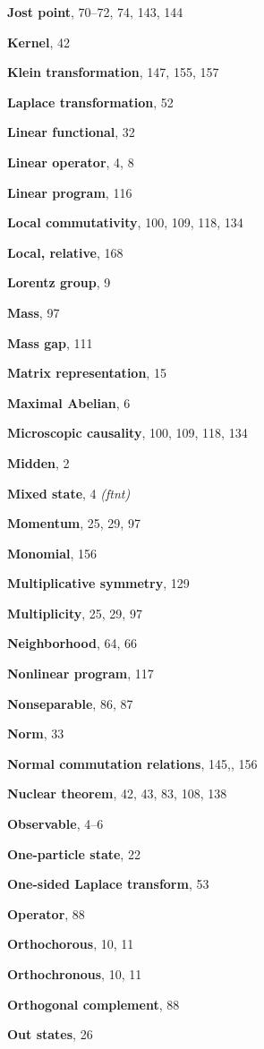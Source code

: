 \begin{theindex}
\indexspace
\item \textbf{Jost point}, 70--72, 74, 143, 144

\indexspace
\item \textbf{Kernel}, 42
\item \textbf{Klein transformation}, 147, 155, 157

\item \textbf{Laplace transformation}, 52
\item \textbf{Linear functional}, 32
\item \textbf{Linear operator}, 4, 8
\item \textbf{Linear program}, 116
\item \textbf{Local commutativity}, 100, 109, 118, 134
\item \textbf{Local, relative}, 168
\item \textbf{Lorentz group}, 9

\indexspace
\item \textbf{Mass}, 97
\item \textbf{Mass gap}, 111
\item \textbf{Matrix representation}, 15
\item \textbf{Maximal Abelian}, 6
\item \textbf{Microscopic causality}, 100, 109, 118, 134
\item \textbf{Midden}, 2
\item \textbf{Mixed state}, 4 \textit{(ftnt)}
\item \textbf{Momentum}, 25, 29, 97
\item \textbf{Monomial}, 156
\item \textbf{Multiplicative symmetry}, 129
\item \textbf{Multiplicity}, 25, 29, 97

\indexspace
\item \textbf{Neighborhood}, 64, 66
\item \textbf{Nonlinear program}, 117
\item \textbf{Nonseparable}, 86, 87
\item \textbf{Norm}, 33
{\raggedright
\item \textbf{Normal commutation relations}, 145,, 156\par}
\item \textbf{Nuclear theorem}, 42, 43, 83, 108, 138

\indexspace
\item \textbf{Observable}, 4--6
\item \textbf{One-particle state}, 22
\item \textbf{One-sided Laplace transform}, 53
\item \textbf{Operator}, 88
\item \textbf{Orthochorous}, 10, 11
\item \textbf{Orthochronous}, 10, 11
\item \textbf{Orthogonal complement}, 88
\item \textbf{Out states}, 26


\end{theindex}
